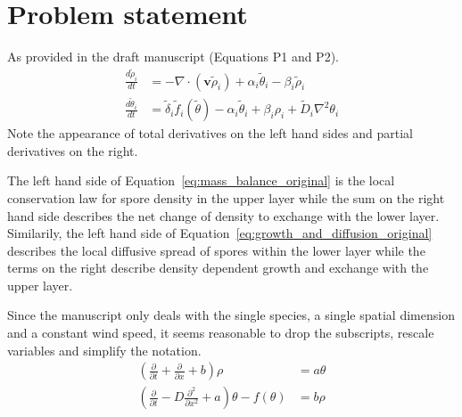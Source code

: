 \documentclass[12pt]{amsart}
\begin{document}
\maketitle


\section{Problem statement}

As provided in the draft manuscript (Equations P1 and P2).
\begin{subequations}
\begin{align}
  \frac{d\tilde{\rho}_i}{dt} & = -\nabla \cdot (\mathbf{v}\tilde{\rho}_{i}) +
  \alpha_{i} \tilde{\theta}_{i} -
  \beta_{i}\tilde{\rho}_{i} \label{eq:mass_balance_original}\\
  \frac{d\tilde{\theta}_i}{dt} & = \tilde{\delta}_{i}  \tilde{f}_i(\tilde{\theta}) -
  \alpha_{i} \tilde{\theta}_{i} +
  \beta_{i}\rho_i +
  \tilde{D}_{i}\nabla^2\theta_{i} \label{eq:growth_and_diffusion_original}
\end{align}
\end{subequations}
Note the appearance of total derivatives on the left hand sides and
partial derivatives on the right.  

The left hand side of Equation~\ref{eq:mass_balance_original} is the 
local conservation law for spore density in the upper layer while
the sum on the right hand side describes the net change of density to
exchange with the lower layer.  Similarily, the left hand side of
Equation~\ref{eq:growth_and_diffusion_original} describes the local diffusive
spread of spores within the lower layer while the terms on the right
describe density dependent growth and exchange with the upper layer.  

Since the manuscript only deals with the single species, a single
spatial dimension and a constant wind speed, it seems reasonable to
drop the subscripts, rescale variables and simplify the notation.
\begin{subequations}
\begin{align}
  \left(\frac{\partial}{\partial t} +
  \frac{\partial}{\partial x} +
  b\right)\rho &=
  a \theta \label{eq:balance_law}\\
  \left(\frac{\partial}{\partial t} - D\frac{\partial^2}{\partial x^2}+ a\right)\theta -
  f(\theta) & = b\rho \label{eq:Fisher_Kolmogorov_balance}
\end{align}
\end{subequations}
\end{document}
